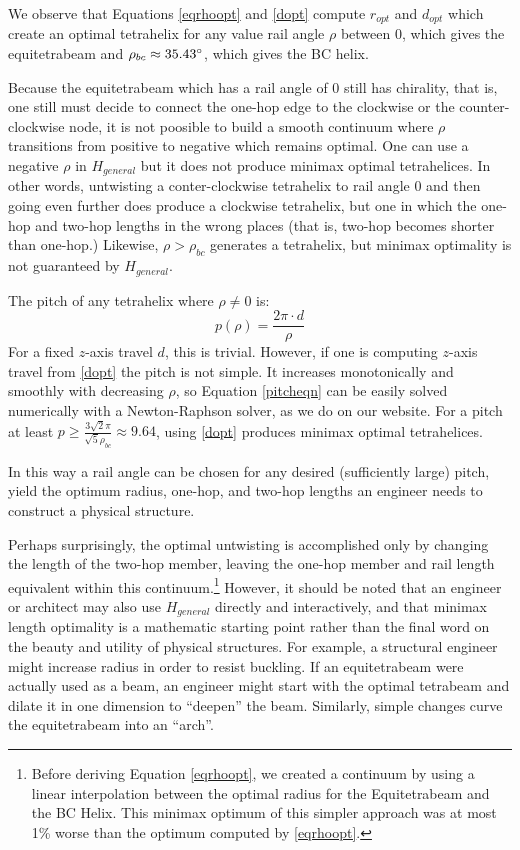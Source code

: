 \documentclass[11pt]{article}
\begin{document}
We observe that Equations \eqref{eqrhoopt} and \eqref{dopt} compute $r_{opt}$ and $d_{opt}$ which
create an optimal tetrahelix for any value rail angle $\rho$ between $0$, which
gives the equitetrabeam and
$\rho_{bc} \approx 35.43 \degree$, which gives the BC helix.

 Because the equitetrabeam which has a rail angle of $0$ still has
 chirality, that is, one still must decide to connect the one-hop edge to
 the clockwise or the counter-clockwise node, it is not poosible to build
 a smooth continuum where $\rho$ transitions from positive to negative
 which remains optimal. One can use a negative $\rho$ in $H_{general}$
 but it does not produce minimax optimal tetrahelices. In other words,
 untwisting a conter-clockwise tetrahelix to rail angle $0$ and then going
even further does produce a clockwise tetrahelix, but one in which the
 one-hop and two-hop lengths in the wrong places (that is, two-hop
 becomes shorter than one-hop.) Likewise, $\rho > \rho_{bc}$ generates
 a tetrahelix, but minimax optimality is not guaranteed by $H_{general}$.
 
The pitch of any tetrahelix 
where $\rho \neq 0$ is:
\begin{equation}
  \label{pitcheqn}
p(\rho) = \frac{2 \pi  \cdot d}{\rho}
\end{equation}
For a fixed $z$-axis travel $d$, this is trivial.
However, if one is computing 
$z$-axis travel from \eqref{dopt} the pitch is not simple.
It increases monotonically and smoothly with decreasing $\rho$, so
Equation \eqref{pitcheqn} can be easily solved numerically with a Newton-Raphson
solver, as we do on our website.
For a pitch at least $ p \geq \frac{3  \sqrt{2}  \pi}{\sqrt{5}\rho_{bc}} \approx 9.64 $,
using \eqref{dopt} produces minimax optimal tetrahelices.

In this way a rail angle can be chosen for any desired (sufficiently large) pitch, yield
the optimum radius, one-hop, and two-hop lengths an engineer needs to
construct a physical structure.

Perhaps surprisingly, the optimal untwisting is accomplished only by
changing the length of the two-hop member, leaving the one-hop member
and rail length equivalent within this continuum.\footnote{Before deriving Equation \eqref{eqrhoopt}, we created a continuum by
using a linear interpolation between the optimal radius for the
Equitetrabeam and the BC Helix. This minimax optimum of this simpler
approach was at most 1\% worse than the optimum computed by
\eqref{eqrhoopt}.}
 However, it should
be noted that an engineer or architect may also use $H_{general}$
directly and interactively, and that minimax length optimality is a
mathematic starting point rather than the final word on the beauty and utility of
physical structures. For example, a structural engineer might increase
radius in order to resist buckling. If an equitetrabeam were actually
used as a beam, an engineer might start with the optimal tetrabeam and
dilate it in one dimension to ``deepen'' the beam. Similarly, simple
changes curve the equitetrabeam into an ``arch''.
\end{document}
